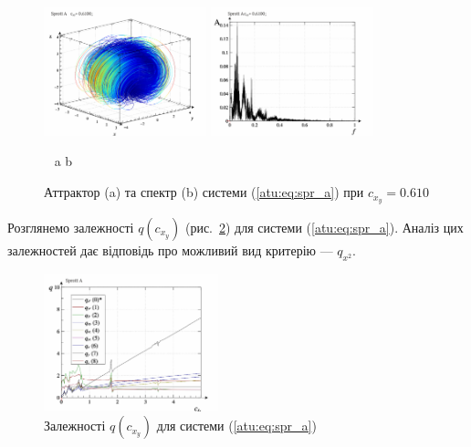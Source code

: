 \documentclass[a4paper,13pt]{atuaref}
\begin{document}
\begin{figure}[htb!]
\centerline{
  \includegraphics[width=0.42\textwidth]{p5/p/cha/spr_a/sprott_a-p_xyz_cx_y=0x610.png}
  \includegraphics[width=0.42\textwidth]{p5/p/cha/spr_a/sprott_a_f-p_f_cx_y=0x610.png}
}
  \vspace{-1.5ex}
  \begin{center}
    ~ \hfill a \hfill\hfill b \hfill ~
  \end{center}
  \vspace{-2.5ex}
  \caption{Аттрактор (a) та спектр (b) системи (\ref{atu:eq:spr_a}) при $c_{x_y} =0.610$}
\label{atu:f:spr_a_p_0610}
\end{figure}

Розглянемо залежності $q(c_{x_y})$ (рис.~\ref{atu:f:spr_a_q})
для системи (\ref{atu:eq:spr_a}). Аналіз цих залежностей дає
відповідь про можливий вид критерію --- $q_{x^2}$.

\begin{figure}[htb!]
\centerline{
  \includegraphics[width=0.45\textwidth]{p5/p/cha/spr_a/sprott_a_q-p_c_x_y.png}
}
\caption{Залежності $q(c_{x_y})$ для системи (\ref{atu:eq:spr_a}) }
\label{atu:f:spr_a_q}
\end{figure}
\end{document}
